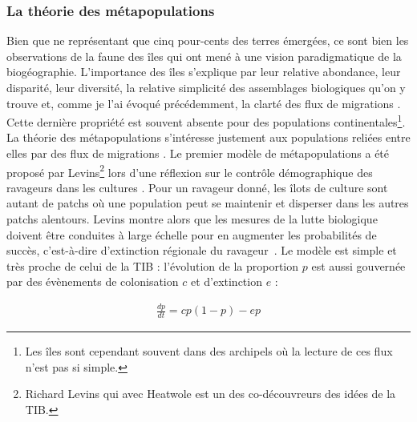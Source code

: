 \subsubsection*{La théorie des
métapopulations}\label{la-thuxe9orie-des-muxe9tapopulations}

Bien que ne représentant que cinq pour-cents des terres émergées, ce
sont bien les observations de la faune des îles qui ont mené à une
vision paradigmatique de la biogéographie. L'importance des îles
s'explique par leur relative abondance, leur disparité, leur diversité,
la relative simplicité des assemblages biologiques qu'on y trouve et,
comme je l'ai évoqué précédemment, la clarté des flux de migrations
\citep{Simberloff1974a}. Cette dernière propriété est souvent absente
pour des populations continentales\footnote{Les îles sont cependant
  souvent dans des archipels où la lecture de ces flux n'est pas si
  simple.}. La théorie des métapopulations s'intéresse justement aux
populations reliées entre elles par des flux de migrations
\citep{Hanski2010}. Le premier modèle de métapopulations a été proposé
par Levins\footnote{Richard Levins qui avec Heatwole est un des
  co-découvreurs des idées de la TIB.} lors d'une réflexion sur le
contrôle démographique des ravageurs dans les cultures
\citep{Levins1969}. Pour un ravageur donné, les îlots de culture sont
autant de patchs où une population peut se maintenir et disperser dans
les autres patchs alentours. Levins montre alors que les mesures de la
lutte biologique doivent être conduites à large échelle pour en
augmenter les probabilités de succès, c'est-à-dire d'extinction
régionale du ravageur~\citep{Levins1969}. Le modèle est simple et très
proche de celui de la TIB : l'évolution de la proportion \(p\) est aussi
gouvernée par des évènements de colonisation \(c\) et d'extinction \(e\)
:

\begin{eqnarray}
\label{eqMW}
\frac{dp}{dt} = cp(1-p)-ep
\end{eqnarray}


